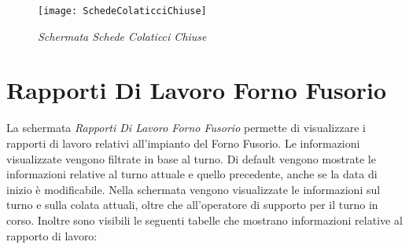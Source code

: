   \begin{figure}[H]
    \texttt{[image: SchedeColaticciChiuse]}
    \centering
    \caption{\textit{Schermata Schede Colaticci Chiuse}}
    \label{fig:SchedeColaticciChiuse}
  \end{figure}
  

  
  \section{Rapporti Di Lavoro Forno Fusorio}
  La schermata \textit{Rapporti Di Lavoro Forno Fusorio} permette di visualizzare
  i rapporti di lavoro relativi all'impianto del Forno Fusorio. Le informazioni visualizzate vengono filtrate in base al turno.
  Di default vengono mostrate le informazioni relative al turno attuale e quello precedente, anche se la data di inizio è
  modificabile. Nella schermata vengono visualizzate le informazioni sul turno e sulla colata attuali, oltre che all'operatore
  di supporto per il turno in corso. Inoltre sono visibili le seguenti tabelle che mostrano informazioni relative al 
  rapporto di lavoro:
